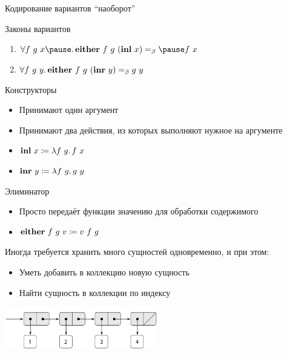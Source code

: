     \begin{frame}[fragile]{Кодирование вариантов ``наоборот''}
        \begin{block}{Законы вариантов}
            \begin{enumerate}
                \item $\forall f~g~x \pause \ldotp \term{either} \ap f \ap g \ap (\term{inl} \ap x) \eqbeta \pause f \ap x$
                \item $\forall f~g~y \ldotp \mathbf{either} ~ f ~ g ~ (\mathbf{inr} ~ y) =_\beta g ~ y$
            \end{enumerate}
        \end{block}
        \pause
        \begin{block}{Конструкторы}
            \begin{itemize}
                \item Принимают один аргумент
                \item Принимают два действия, из которых выполняют нужное на аргументе
                \item $\mathbf{inl} ~ x \coloneqq \lambda f~g \ldotp f ~ x$
                \item $\mathbf{inr} ~ y \coloneqq \lambda f~g \ldotp g ~ y$
            \end{itemize}
        \end{block}
        \pause
        \begin{block}{Элиминатор}
            \begin{itemize}
                \item Просто передаёт функции значению для обработки содержимого
                \item $\mathbf{either} ~ f ~ g ~ v \coloneqq v ~ f ~ g$
            \end{itemize}
        \end{block}
    \end{frame}


    \begin{frame}{\subsecname}
        Иногда требуется хранить много сущностей одновременно, и при этом:
        \begin{itemize}
            \item Уметь добавить в коллекцию новую сущность
            \item Найти сущность в коллекции по индексу
        \end{itemize}
        \vspace{0.5em}
        \begin{center}
            \includegraphics[width=0.5\textwidth]{figs/list}
        \end{center}
    \end{frame}

